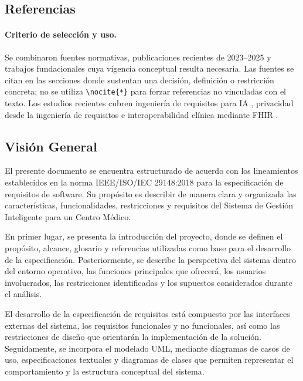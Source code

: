 \documentclass[11pt,a4paper]{article}
\begin{document}
	\subsection{ Referencias}
	
	\paragraph{Criterio de selección y uso.} Se combinaron fuentes normativas,
	publicaciones recientes de 2023--2025 y trabajos fundacionales cuya vigencia
	conceptual resulta necesaria. Las fuentes se citan en las secciones donde
	sustentan una decisión, definición o restricción concreta; no se utiliza
	\verb|\nocite{*}| para forzar referencias no vinculadas con el texto. Los
	estudios recientes cubren ingeniería de requisitos para IA
	\cite{ahmad2023,habiba2024}, privacidad desde la ingeniería de requisitos
	\cite{negriribalta2024,herwanto2024} e interoperabilidad clínica mediante
	FHIR \cite{bikkanuri2024,smartfhir2024}.
	
	\subsection{ Visión General}
	
	El presente documento se encuentra estructurado de acuerdo con los lineamientos establecidos en la norma IEEE/ISO/IEC 29148:2018 para la especificación de requisitos de software. Su propósito es describir de manera clara y organizada las características, funcionalidades, restricciones y requisitos del Sistema de Gestión Inteligente para un Centro Médico.
	
	En primer lugar, se presenta la introducción del proyecto, donde se definen el propósito, alcance, glosario y referencias utilizadas como base para el desarrollo de la especificación. Posteriormente, se describe la perspectiva del sistema dentro del entorno operativo, las funciones principales que ofrecerá, los usuarios involucrados, las restricciones identificadas y los supuestos considerados durante el análisis.
	
	El desarrollo de la especificación de requisitos está compuesto por las interfaces externas del sistema, los requisitos funcionales y no funcionales, así como las restricciones de diseño que orientarán la implementación de la solución. Seguidamente, se incorpora el modelado UML, mediante diagramas de casos de uso, especificaciones textuales y diagramas de clases que permiten representar el comportamiento y la estructura conceptual del sistema.
	
\end{document}
